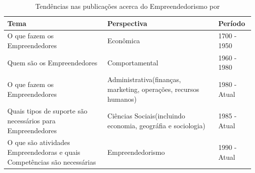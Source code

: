 \begin{table}[!htb]
	\centering
	\label{tabela:tendencias_nas_publicacoes_acerca_do_empreendedorismo}
	\begin{tabular}{ | p{6cm} | p{6cm} | p{3cm} | }
		\hline
		Tema & Perspectiva & Período \\ \hline
		O que fazem os Empreendedores & Econômica & 1700 - 1950 \\ \hline
		Quem são os Empreendedores & Comportamental & 1960 - 1980 \\ \hline
		O que fazem os Empreendedores & Administrativa(finanças, marketing, operações, recursos humanos) & 1980 - Atual \\ \hline
		Quais tipos de suporte são necessários para Empreendedores & Ciências Sociais(incluindo economia, geográfia e sociologia) & 1985 - Atual \\ \hline
		O que são atividades Empreendedoras e quais Competências são necessárias & Empreendedorismo & 1990 - Atual \\ \hline
	\end{tabular}
	\caption{Tendências nas publicações acerca do Empreendedorismo por \cite{Filion1998}}
\end{table}


